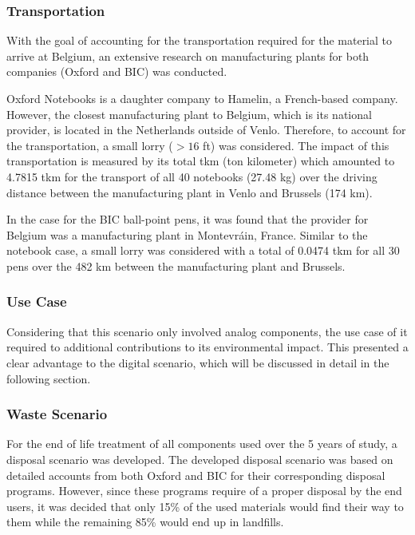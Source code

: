 \subsubsection*{Transportation}
With the goal of accounting for the transportation required for the material to arrive at Belgium, an extensive research on manufacturing plants for both companies (Oxford and BIC) was conducted.

Oxford Notebooks is a daughter company to Hamelin, a French-based company. However, the closest manufacturing plant to Belgium, which is its national provider, is located in the Netherlands outside of Venlo. Therefore, to account for the transportation, a small lorry ($> 16$ ft) was considered. The impact of this transportation is measured by its total tkm (ton kilometer) which amounted to 4.7815 tkm for the transport of all 40 notebooks (27.48 kg) over the driving distance between the manufacturing plant in Venlo and Brussels (174 km).

In the case for the BIC ball-point pens, it was found that the provider for Belgium was a manufacturing plant in Montevráin, France. Similar to the notebook case, a small lorry was considered with a total of 0.0474 tkm for all 30 pens over the 482 km between the manufacturing plant and Brussels.

\subsubsection*{Use Case}
Considering that this scenario only involved analog components, the use case of it required to additional contributions to its environmental impact. This presented a clear advantage to the digital scenario, which will be discussed in detail in the following section.

\subsubsection*{Waste Scenario}
For the end of life treatment of all components used over the 5 years of study, a disposal scenario was developed. The developed disposal scenario was based on detailed accounts from both Oxford and BIC for their corresponding disposal programs. However, since these programs require of a proper disposal by the end users, it was decided that only 15\% of the used materials would find their way to them while the remaining 85\% would end up in landfills.


